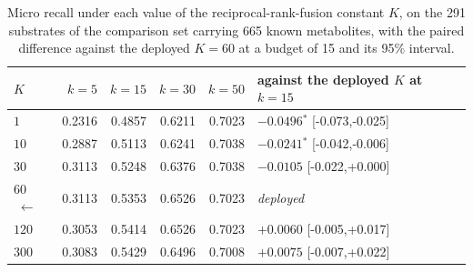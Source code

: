 \begin{table}[h]
\centering\small
\begin{threeparttable}
\caption{Micro recall under each value of the reciprocal-rank-fusion constant $K$, on the 291 substrates of the comparison set carrying 665 known metabolites, with the paired difference against the deployed $K=60$ at a budget of 15 and its 95\% interval.}
\label{tab:si-fusion-k}
\begin{tabular}{lrrrrl}
\toprule
$K$ & $k=5$ & $k=15$ & $k=30$ & $k=50$ & against the deployed $K$ at $k=15$ \\
\midrule
$1$ & 0.2316 & 0.4857 & 0.6211 & 0.7023 & $-0.0496$$^{*}$ {\scriptsize [-0.073,-0.025]} \\
$10$ & 0.2887 & 0.5113 & 0.6241 & 0.7038 & $-0.0241$$^{*}$ {\scriptsize [-0.042,-0.006]} \\
$30$ & 0.3113 & 0.5248 & 0.6376 & 0.7038 & $-0.0105$\phantom{$^{*}$} {\scriptsize [-0.022,+0.000]} \\
$60$$\;\leftarrow$ & 0.3113 & 0.5353 & 0.6526 & 0.7023 & \emph{deployed} \\
$120$ & 0.3053 & 0.5414 & 0.6526 & 0.7023 & $+0.0060$\phantom{$^{*}$} {\scriptsize [-0.005,+0.017]} \\
$300$ & 0.3083 & 0.5429 & 0.6496 & 0.7008 & $+0.0075$\phantom{$^{*}$} {\scriptsize [-0.007,+0.022]} \\
\bottomrule
\end{tabular}


\end{threeparttable}
\end{table}
